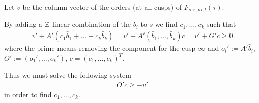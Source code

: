 \documentclass{article}
\begin{document}
Let $v$ be the column vector of the orders (at all cusps) of
$F_{\bar{s},\bar{r},m,t}(\tau)$.

By adding a $\setZ$-linear
combination of the $\bar{b}_i$ to $\bar{s}$ we find
$c_1,\ldots,c_k$ such that
\begin{gather}
  v' + A'(c_1\bar{b}_1+\dots+c_k\bar{b}_k)
  =
  v' + A'(\bar{b}_1,\ldots,\bar{b}_k) c
  =
  v' + G' c
  \ge 0
\end{gather}
where the prime means removing the component for the cusp $\infty$
and $o_i':= A' \bar{b}_i$, $O':=(o_1',\ldots,o_k')$,
$c = (c_1,\ldots, c_k)^T$.

Thus we must solve the following system
\begin{gather}
  \label{eq:remove-non-infinity-poles}
  O' c \ge -v'
\end{gather}
in order to find $c_1,\ldots, c_k$.


\iffalse
By subtracting a $\setZ$-linear
combination of the $\bar{b}_i$ from $\bar{s}$ we find
$c_1,\ldots,c_k$ such that
\begin{gather}
  v' - A'(c_1\bar{b}_1+\dots+c_k\bar{b}_k)
  =
  v' - A'(\bar{b}_1,\ldots,\bar{b}_k) c
  =
  - u' + G' c
  \ge 0
\end{gather}
where the prime means removing the component for the cusp $\infty$
and $u':=-v'$, $g_i':= - A' \bar{b}_i$, $G':=(g_1',\ldots,g_k')$,
$c = (c_1,\ldots, c_k)^T$.

In the implementation we work with grades (which is the negation of
the expansion order and corresponds to the pole order of the
expansion). Thus we must solve the following system
\begin{gather}
  \label{eq:remove-non-infinity-poles}
  G' c \ge u'
\end{gather}
in order to find $c_1,\ldots, c_k$.
\fi








\end{document}
